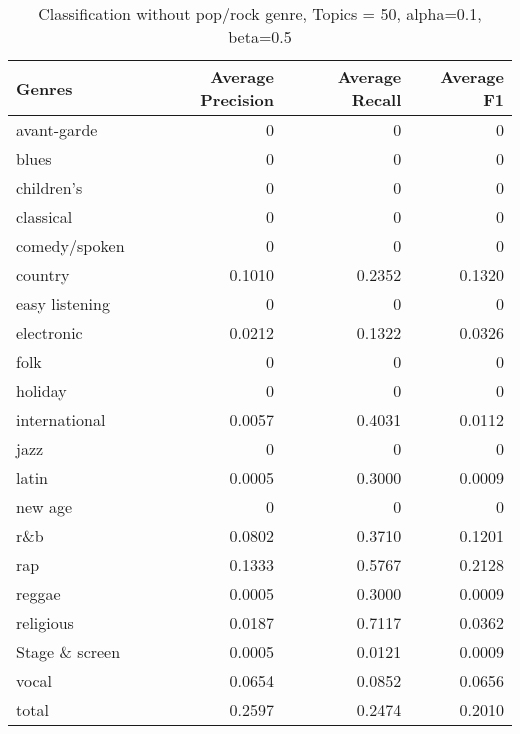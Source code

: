 \begin{table}[h]
\begin{tabular}{|l|r|r|r|}

\hline
\textbf{Genres} &  \textbf{Average Precision} & \textbf{Average Recall} & \textbf{Average F1} \\
\hline
avant-garde & 0 & 	0	 & 0\\
blues & 0 & 	0 & 	0\\
children's & 0 & 	0 & 	0\\
classical & 0	 & 0 & 	0\\
comedy/spoken & 0 & 	0	 & 0\\
country & 0.1010	 & 0.2352	 & 0.1320\\
easy listening & 0	 & 0 & 	0\\
electronic & 0.0212	 & 0.1322 & 	0.0326\\
folk & 0	 & 0 & 	0\\
holiday & 0 & 	0 & 	0\\
international & 0.0057	 & 0.4031 & 	0.0112\\
jazz & 0	 & 0	 & 0\\
latin & 0.0005	 & 0.3000 & 	0.0009\\
new age & 0 & 	0	 & 0\\
r\&b & 0.0802 & 	0.3710 & 	0.1201\\
rap & 0.1333	 & 0.5767	 & 0.2128\\
reggae & 0.0005	 & 0.3000 & 	0.0009\\
religious & 0.0187	 & 0.7117 & 	0.0362\\
Stage \& screen & 0.0005	 & 0.0121 & 	0.0009\\
vocal & 0.0654 & 	0.0852 & 	0.0656\\
total & 0.2597 & 	0.2474 & 	0.2010\\
\hline
\end{tabular}
\caption{Classification without pop/rock genre, Topics = 50, alpha=0.1, beta=0.5}
\end{table}